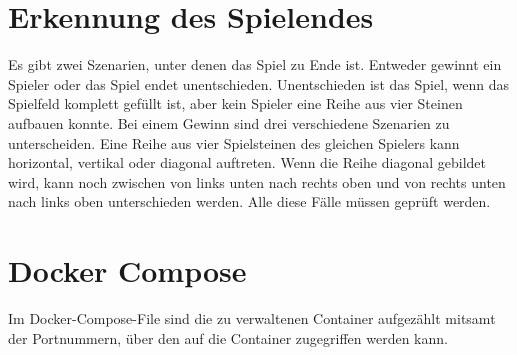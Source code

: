 \section{Erkennung des Spielendes}\label{sec:GameOver}
Es gibt zwei Szenarien, unter denen das Spiel zu Ende ist. Entweder gewinnt ein Spieler oder das Spiel endet unentschieden. Unentschieden ist das Spiel, wenn das Spielfeld komplett gefüllt ist, aber kein Spieler eine Reihe aus vier Steinen aufbauen konnte.
Bei einem Gewinn sind drei verschiedene Szenarien zu unterscheiden. Eine Reihe aus vier Spielsteinen des gleichen Spielers kann horizontal, vertikal oder diagonal auftreten. Wenn die Reihe diagonal gebildet wird, kann noch zwischen von links unten nach rechts oben und von rechts unten nach links oben unterschieden werden. Alle diese Fälle müssen geprüft werden.

\section{Docker Compose}\label{sec:Docker Compose}
Im Docker-Compose-File sind die zu verwaltenen Container aufgezählt mitsamt der Portnummern, über den auf die Container zugegriffen werden kann.


